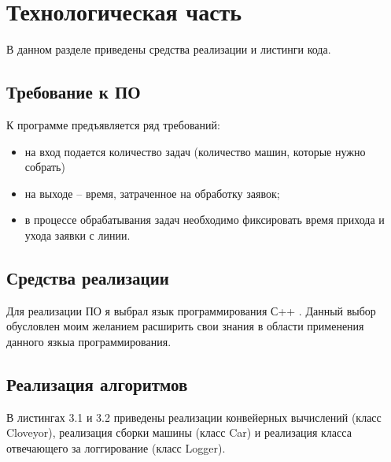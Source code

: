\documentclass[12pt]{report}
\begin{document}
\chapter{Технологическая часть}

В данном разделе приведены средства реализации и листинги кода.

\section{Требование к ПО}

К программе предъявляется ряд требований:

\begin{itemize}
	\item на вход подается количество задач (количество машин, которые нужно собрать)
	\item на выходе -- время, затраченное на обработку заявок;
	\item в процессе обрабатывания задач необходимо фиксировать время прихода и ухода заявки с линии.
\end{itemize}

\section{Средства реализации}

Для реализации ПО я выбрал язык программирования С++ \cite{C++}. Данный выбор обусловлен моим желанием расширить свои знания в области
применения данного язкыа программирования.

\section{Реализация алгоритмов}

В листингах 3.1 и 3.2 приведены реализации конвейерных вычислений (класс Cloveyor), реализация сборки машины (класс Car) и реализация класса отвечающего за логгирование (класс Logger).
\end{document}
